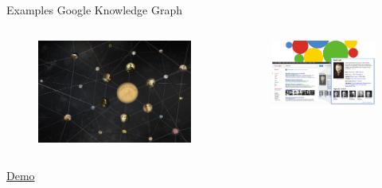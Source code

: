 \documentclass[onlymath,xcolor=pdftex,dvipsnames,table]{beamer}
\newcommand{\head}[1]{{\large\color{OliveGreen}#1\\[5pt]}}
\begin{document}
\begin{frame}{Examples}
\head{Google Knowledge Graph~\cite{googleknowledgegraph}}
\begin{columns}[c]
  \begin{figure}
    \centering
    \includegraphics[width=\linewidth]{120701_google_knowledge_graph.jpg}
  \end{figure}
  \begin{figure}
    \centering
    \includegraphics[width=\linewidth]{Google-Knowledge-Graph.jpg}
  \end{figure}
\end{columns}
\begin{center}
  \href{http://www.google.com/insidesearch/features/search/knowledge.html}{\large Demo}
\end{center}
\end{frame}
\end{document}
